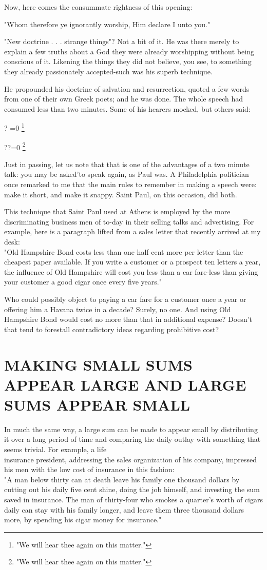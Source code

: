 \documentclass[10pt]{article}
\let\svthefootnote\thefootnote
\newcommand\blfootnotetext[1]{%
  \let\thefootnote\relax\footnote{#1}%
  \addtocounter{footnote}{-1}%
  \let\thefootnote\svthefootnote%
}
\let\svfootnotetext\footnotetext
\renewcommand\footnotetext[2][?]{%
  \if\relax#1\relax%
    \ifnum\value{footnote}=0\blfootnotetext{#2}\else\svfootnotetext{#2}\fi%
  \else%
    \if?#1\ifnum\value{footnote}=0\blfootnotetext{#2}\else\svfootnotetext{#2}\fi%
    \else\svfootnotetext[#1]{#2}\fi%
  \fi
}
\begin{document}
Now, here comes the consummate rightness of this opening:

\begin{displayquote}
"Whom therefore ye ignorantly worship, Him declare I unto you."
\end{displayquote}

"New doctrine . . . strange things"? Not a bit of it. He was there merely to explain a few truths about a God they were already worshipping without being conscious of it. Likening the things they did not believe, you see, to something they already passionately accepted-such was his superb technique.

He propounded his doctrine of salvation and resurrection, quoted a few words from one of their own Greek poets; and he was done. The whole speech had consumed less than two minutes. Some of his hearers mocked, but others said:

Just in passing, let us note that that is one of the advantages of a two minute talk: you may be asked'to speak again, as Paul was. A Philadelphia politician once remarked to me that the main rules to remember in making a speech were: make it short, and make it snappy. Saint Paul, on this occasion, did both.

This technique that Saint Paul used at Athens is employed by the more discriminating business men of to-day in their selling talks and advertising. For example, here is a paragraph lifted from a sales letter that recently arrived at my desk:\\
"Old Hampshire Bond costs less than one half cent more per letter than the cheapest paper available. If you write a customer or a prospect ten letters a year, the influence of Old Hampshire will cost you less than a car fare-less than giving your customer a good cigar once every five years."

Who could possibly object to paying a car fare for a customer once a year or offering him a Havana twice in a decade? Surely, no one. And using Old Hampshire Bond would cost no more than that in additional expense? Doesn't that tend to forestall contradictory ideas regarding prohibitive cost?

\section*{MAKING SMALL SUMS APPEAR LARGE AND LARGE SUMS APPEAR SMALL}
In much the same way, a large sum can be made to appear small by distributing it over a long period of time and comparing the daily outlay with something that seems trivial. For example, a life\\
insurance president, addressing the sales organization of his company, impressed his men with the low cost of insurance in this fashion:\\
"A man below thirty can at death leave his family one thousand dollars by cutting out his daily five cent shine, doing the job himself, and investing the sum saved in insurance. The man of thirty-four who smokes a quarter's worth of cigars daily can stay with his family longer, and leave them three thousand dollars more, by spending his cigar money for insurance."
\end{document}
